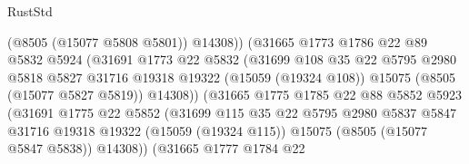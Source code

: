 \begin{lexlean}{RustStd}
\begin{coremodule}
                                    (@8505 (@15077 @5808 @5801))
                                    @14308))
                                (@31665
                                  @1773
                                  @1786
                                  @22
                                  @89
                                  @5832
                                  @5924
                                  (@31691
                                    @1773
                                    @22
                                    @5832
                                    (@31699
                                      @108
                                      @35
                                      @22
                                      @5795
                                      @2980
                                      @5818
                                      @5827
                                      @31716
                                      @19318
                                      @19322
                                      (@15059 (@19324 @108))
                                      @15075
                                      (@8505 (@15077 @5827 @5819))
                                      @14308))
                                  (@31665
                                    @1775
                                    @1785
                                    @22
                                    @88
                                    @5852
                                    @5923
                                    (@31691
                                      @1775
                                      @22
                                      @5852
                                      (@31699
                                        @115
                                        @35
                                        @22
                                        @5795
                                        @2980
                                        @5837
                                        @5847
                                        @31716
                                        @19318
                                        @19322
                                        (@15059 (@19324 @115))
                                        @15075
                                        (@8505 (@15077 @5847 @5838))
                                        @14308))
                                    (@31665
                                      @1777
                                      @1784
                                      @22

\end{coremodule}
\end{lexlean}
